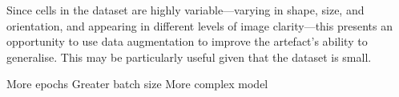 Since cells in the dataset are highly variable⁠—varying in shape, size, and orientation, and appearing in different levels of image clarity⁠—this presents an opportunity to use data augmentation to improve the artefact's ability to generalise. This may be particularly useful given that the dataset is small.

More epochs
Greater batch size
More complex model 
